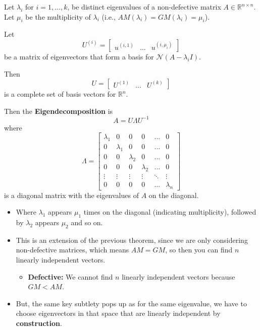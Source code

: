 \begin{theorem}
    Let $\lambda_i$ for $i = 1, \dots, k$, be distinct eigenvalues of a non-defective matrix $A \in \mathbb{R}^{n \times n}$. Let $\mu_i$ be the multiplicity of $\lambda_i$ (i.e., $AM(\lambda_i) = GM(\lambda_i) = \mu_i$).
    \vspace{1em}

    Let
    \[
    U^{(i)} = \begin{bmatrix} 
    u^{(i,1)} & \dots & u^{(i,\mu_i)}
    \end{bmatrix}
    \]
    be a matrix of eigenvectors that form a basis for $\mathcal{N}(A - \lambda_i I)$.
    \vspace{1em}

    Then 
    \[
    U = \begin{bmatrix} 
    U^{(1)} & \dots & U^{(k)}
    \end{bmatrix}
    \]
    is a complete set of basis vectors for $\mathbb{R}^n$.
    \vspace{1em}

    Then the \textbf{Eigendecomposition} is
    \[
    A = U \Lambda U^{-1}
    \]
    where 
    \[
    \Lambda = \begin{bmatrix}
    \lambda_1 & 0 & 0 & 0 & \dots & 0 \\
    0 & \lambda_1 & 0 & 0 & \dots & 0 \\
    0 & 0 & \lambda_2 & 0 & \dots & 0 \\
    0 & 0 & 0 & \lambda_2 & \dots & 0 \\
    \vdots & \vdots & \vdots & \vdots & \ddots & \vdots \\
    0 & 0 & 0 & 0 & \dots & \lambda_n
    \end{bmatrix}
    \]
    is a diagonal matrix with the eigenvalues of $A$ on the diagonal.
    \begin{itemize}
        \item Where $\lambda_1$ appears $\mu_1$ times on the diagonal (indicating multiplicity), followed by $\lambda_2$ appears $\mu_2$ and so on. 
    \end{itemize}
\end{theorem}

\begin{warning}
    \begin{itemize}
        \item This is an extension of the previous theorem, since we are only considering non-defective matrices, which means $AM=GM$, so then you can find $n$ linearly independent vectors. 
        \begin{itemize}
            \item \textbf{Defective:} We cannot find $n$ linearly independent vectors because $GM < AM$.
        \end{itemize}
        \item But, the same key subtlety pops up as for the same eigenvalue, we have to choose eigenvectors in that space that are linearly independent by \textbf{construction}.
    \end{itemize}
\end{warning}


